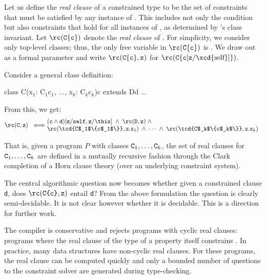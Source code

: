 Let us define the {\em real clause} of a constrained type
 to be
the set of constraints that must be satisfied by any instance of
. This includes not only the condition  but also
constraints that hold for all instances of , as
determined by 's class invariant. Let 
$\rc({\tt C\{c\}})$ denote the {\em real clause} of .
For simplicity, we consider only top-level classes; thus, the
only free variable
in $\rc({\tt C\{c\}})$ is .  We draw out  as a
formal parameter and write $\rc({\tt C\{c\}}, {\tt z})$
for $\rc({\tt C\{c}[{\tt z}/\mbox{\xcd{self}}]\})$.

Consider a general class definition:
\begin{xten}
class C(x$_1$: C$_1${c$_1$}, ..., x$_k$: C$_k${c$_k$}){c}
  extends D{d} { ... }
\end{xten}

\noindent From this, we get:
%
$$\rc({\tt C},{\tt z}) ~ \iff \!\!\!\!\!\!\!\!\!\!
\begin{array}{l}
\quad  ({\tt c} \wedge {\tt d})[{\tt z}/{\tt self},{\tt z}/\this]
\;\wedge\; \rc({\tt D},{\tt z}) \;\wedge \\
\quad  \rc(\mbox{\tcd{C$_1$\{c$_1$\}}}, {\tt z.x}_1) \;\wedge\; \cdots
\;\wedge\; \rc(\mbox{\tcd{C$_k$\{c$_k$\}}}, {\tt z.x}_k)
\end{array}
$$

That is, given a program $P$ with classes ${\tt C}_1,\ldots, {\tt
C}_k$, the set of real clauses for ${\tt C}_1,\ldots, {\tt C}_k$ are
defined in a mutually recursive fashion through the Clark completion
of a Horn clause theory (over an underlying constraint system).

The central algorithmic question now becomes whether given a
constrained clause {\tt d}, does $\rc(\mbox{\tt C\{c\}},{\tt z})$ entail {\tt d}? 
%
From the above formulation the question is clearly semi-decidable. It
is not clear however whether it is decidable. This is a direction for
further work.

The \Xten{} compiler is conservative and rejects
programs with cyclic real clauses: programs where the real
clause of the type
of a property  itself constrains .
%
%
In practice, many data structures have non-cyclic real clauses.
For these programs, the real clause can be computed quickly and
only a bounded number of questions to the constraint solver are
generated during type-checking.


